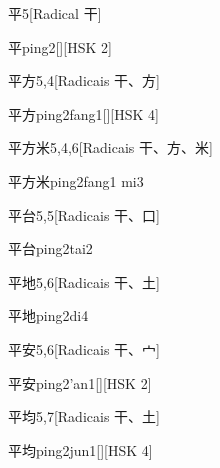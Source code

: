 \begin{entry}{平}{5}[Radical ⼲]
  \begin{phonetics}{平}{ping2}[][HSK 2]
  \end{phonetics}
\end{entry}

\begin{entry}{平方}{5,4}[Radicais ⼲、⽅]
  \begin{phonetics}{平方}{ping2fang1}[][HSK 4]
  \end{phonetics}
\end{entry}

\begin{entry}{平方米}{5,4,6}[Radicais ⼲、⽅、⽶]
  \begin{phonetics}{平方米}{ping2fang1 mi3}
  \end{phonetics}
\end{entry}

\begin{entry}{平台}{5,5}[Radicais ⼲、⼝]
  \begin{phonetics}{平台}{ping2tai2}
  \end{phonetics}
\end{entry}

\begin{entry}{平地}{5,6}[Radicais ⼲、⼟]
  \begin{phonetics}{平地}{ping2di4}
  \end{phonetics}
\end{entry}

\begin{entry}{平安}{5,6}[Radicais ⼲、⼧]
  \begin{phonetics}{平安}{ping2'an1}[][HSK 2]
  \end{phonetics}
\end{entry}

\begin{entry}{平均}{5,7}[Radicais ⼲、⼟]
  \begin{phonetics}{平均}{ping2jun1}[][HSK 4]
  \end{phonetics}
\end{entry}

